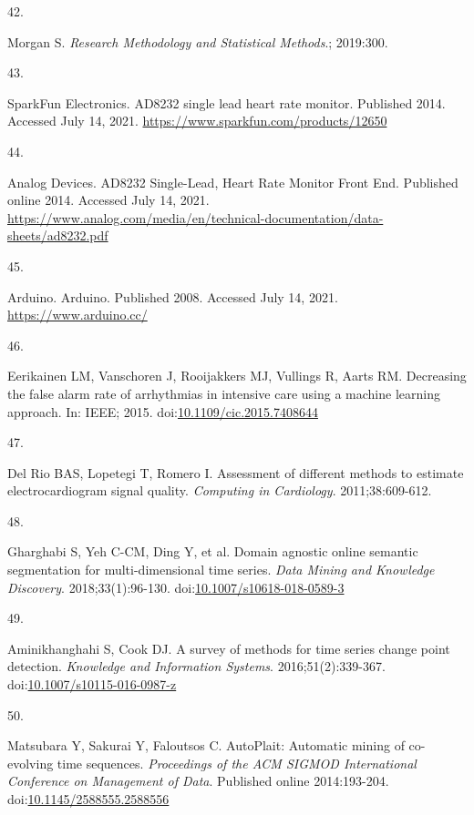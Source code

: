\documentclass[12pt,twoside]{fmupthesis}
\newlength{\csllabelwidth}
\newlength{\cslhangindent}
\newenvironment{CSLReferences}[2] %
 {%
  \setlength{\parindent}{0pt}
  \ifodd #1 \everypar{\setlength{\hangindent}{\cslhangindent}}\ignorespaces\fi
  \ifnum #2 > 0
  \setlength{\parskip}{#2\baselineskip}
  \fi
 }%
 {}
\newcommand{\CSLLeftMargin}[1]{\parbox[t]{\csllabelwidth}{#1}}
\newcommand{\CSLRightInline}[1]{\parbox[t]{\linewidth - \csllabelwidth}{#1}}
\begin{document}
\begin{CSLReferences}{0}{0}
\leavevmode{}%
\CSLLeftMargin{42. }
\CSLRightInline{Morgan S. \emph{{Research Methodology and Statistical Methods}}.; 2019:300.}

\leavevmode{}%
\CSLLeftMargin{43. }
\CSLRightInline{SparkFun Electronics. AD8232 single lead heart rate monitor. Published 2014. Accessed July 14, 2021. \url{https://www.sparkfun.com/products/12650}}

\leavevmode{}%
\CSLLeftMargin{44. }
\CSLRightInline{Analog Devices. {AD8232 Single-Lead, Heart Rate Monitor Front End}. Published online 2014. Accessed July 14, 2021. \url{https://www.analog.com/media/en/technical-documentation/data-sheets/ad8232.pdf}}

\leavevmode{}%
\CSLLeftMargin{45. }
\CSLRightInline{Arduino. {Arduino}. Published 2008. Accessed July 14, 2021. \url{https://www.arduino.cc/}}

\leavevmode{}%
\CSLLeftMargin{46. }
\CSLRightInline{Eerikainen LM, Vanschoren J, Rooijakkers MJ, Vullings R, Aarts RM. Decreasing the false alarm rate of arrhythmias in intensive care using a machine learning approach. In: IEEE; 2015. doi:\href{https://doi.org/10.1109/cic.2015.7408644}{10.1109/cic.2015.7408644}}

\leavevmode{}%
\CSLLeftMargin{47. }
\CSLRightInline{Del Rio BAS, Lopetegi T, Romero I. {Assessment of different methods to estimate electrocardiogram signal quality}. \emph{Computing in Cardiology}. 2011;38:609-612.}

\leavevmode{}%
\CSLLeftMargin{48. }
\CSLRightInline{Gharghabi S, Yeh C-CM, Ding Y, et al. Domain agnostic online semantic segmentation for multi-dimensional time series. \emph{Data Mining and Knowledge Discovery}. 2018;33(1):96-130. doi:\href{https://doi.org/10.1007/s10618-018-0589-3}{10.1007/s10618-018-0589-3}}

\leavevmode{}%
\CSLLeftMargin{49. }
\CSLRightInline{Aminikhanghahi S, Cook DJ. A survey of methods for time series change point detection. \emph{Knowledge and Information Systems}. 2016;51(2):339-367. doi:\href{https://doi.org/10.1007/s10115-016-0987-z}{10.1007/s10115-016-0987-z}}

\leavevmode{}%
\CSLLeftMargin{50. }
\CSLRightInline{Matsubara Y, Sakurai Y, Faloutsos C. AutoPlait: Automatic mining of co-evolving time sequences. \emph{Proceedings of the ACM SIGMOD International Conference on Management of Data}. Published online 2014:193-204. doi:\href{https://doi.org/10.1145/2588555.2588556}{10.1145/2588555.2588556}}


\end{CSLReferences}
\end{document}
